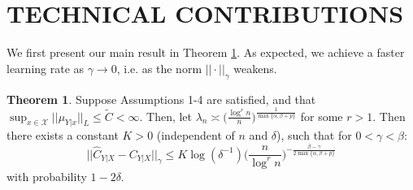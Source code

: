 \documentclass[accepted]{article}
\theoremstyle{definition}
\newtheorem{theorem}{Theorem}
\begin{document}

\section{TECHNICAL CONTRIBUTIONS} \label{Contributions}
We first present our main result in Theorem \ref{Main Result}. As expected, we achieve a faster learning rate as $\gamma \to 0$, i.e. as the norm $||\cdot ||_{\gamma}$ weakens. 



\begin{theorem}
\label{Main Result}
Suppose Assumptions 1-4 are satisfied, and that $\sup_{x \in \mathcal{X}} ||\mu_{Y|x}||_{L} \leq \tilde{C} < \infty$. Then, let $\lambda_n \asymp \Big(\frac{\log^r n}{n}\Big)^{\frac{1}{\max \{\alpha,  \beta + p\}}}$ for some $r > 1$. Then there exists a constant $K > 0$ (independent of $n$ and $\delta$), such that for $0 < \gamma < \beta$:
\begin{equation*}
    ||\hat{C}_{Y|X} - C_{Y|X}||_{\gamma} \leq K\log(\delta^{-1})\Big(\frac{n}{\log^r n}\Big)^{-\frac{\beta - \gamma}{2\max \{\alpha,  \beta + p\}}}
\end{equation*}
with probability $1 - 2\delta$.
\end{theorem}
\end{document}

